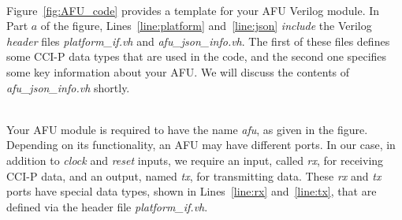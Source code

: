 \documentclass[epsfig,10pt,fullpage]{article}
\begin{document}
~\\
\noindent
Figure~\ref{fig:AFU_code} provides a template for your AFU Verilog module.
In Part $a$ of the figure, 
Lines~\ref{line:platform} and~\ref{line:json} {\it include} the Verilog {\it header}
files {\it platform\_if.vh} and {\it afu\_json\_info.vh}. The first of these files defines
some CCI-P data types that are used in the code, and the second one specifies some key 
information about your AFU.  We will discuss the contents of {\it afu\_json\_info.vh} shortly.

~\\
\noindent
Your AFU module is required to have the name {\it afu}, as given in the figure. Depending
on its functionality, an AFU may have different ports. In our case, in addition to 
{\it clock} and {\it reset} inputs, we require an input, called {\it rx}, for receiving CCI-P 
data, and an output, named {\it tx}, for transmitting data. These {\it rx} and {\it tx} ports 
have special data types, shown in Lines~\ref{line:rx} and~\ref{line:tx}, that are defined 
via the header file {\it platform\_if.vh}.
\end{document}
